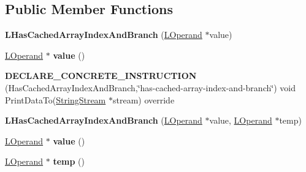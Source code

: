 \subsection*{Public Member Functions}
\begin{DoxyCompactItemize}
\item 
{\bfseries L\+Has\+Cached\+Array\+Index\+And\+Branch} (\hyperlink{classv8_1_1internal_1_1_l_operand}{L\+Operand} $\ast$value)\hypertarget{classv8_1_1internal_1_1_l_has_cached_array_index_and_branch_a466ac157abb71acfb478af7ce2d78d3e}{}\label{classv8_1_1internal_1_1_l_has_cached_array_index_and_branch_a466ac157abb71acfb478af7ce2d78d3e}

\item 
\hyperlink{classv8_1_1internal_1_1_l_operand}{L\+Operand} $\ast$ {\bfseries value} ()\hypertarget{classv8_1_1internal_1_1_l_has_cached_array_index_and_branch_ac41a448a9c06b6b037880bdea9490ae4}{}\label{classv8_1_1internal_1_1_l_has_cached_array_index_and_branch_ac41a448a9c06b6b037880bdea9490ae4}

\item 
{\bfseries D\+E\+C\+L\+A\+R\+E\+\_\+\+C\+O\+N\+C\+R\+E\+T\+E\+\_\+\+I\+N\+S\+T\+R\+U\+C\+T\+I\+ON} (Has\+Cached\+Array\+Index\+And\+Branch,\char`\"{}has-\/cached-\/array-\/index-\/and-\/branch\char`\"{}) void Print\+Data\+To(\hyperlink{classv8_1_1internal_1_1_string_stream}{String\+Stream} $\ast$stream) override\hypertarget{classv8_1_1internal_1_1_l_has_cached_array_index_and_branch_ada0480ef52e3ce280f071aa7c11faa18}{}\label{classv8_1_1internal_1_1_l_has_cached_array_index_and_branch_ada0480ef52e3ce280f071aa7c11faa18}

\item 
{\bfseries L\+Has\+Cached\+Array\+Index\+And\+Branch} (\hyperlink{classv8_1_1internal_1_1_l_operand}{L\+Operand} $\ast$value, \hyperlink{classv8_1_1internal_1_1_l_operand}{L\+Operand} $\ast$temp)\hypertarget{classv8_1_1internal_1_1_l_has_cached_array_index_and_branch_ab312de41323135127a20207e0065a401}{}\label{classv8_1_1internal_1_1_l_has_cached_array_index_and_branch_ab312de41323135127a20207e0065a401}

\item 
\hyperlink{classv8_1_1internal_1_1_l_operand}{L\+Operand} $\ast$ {\bfseries value} ()\hypertarget{classv8_1_1internal_1_1_l_has_cached_array_index_and_branch_ac41a448a9c06b6b037880bdea9490ae4}{}\label{classv8_1_1internal_1_1_l_has_cached_array_index_and_branch_ac41a448a9c06b6b037880bdea9490ae4}

\item 
\hyperlink{classv8_1_1internal_1_1_l_operand}{L\+Operand} $\ast$ {\bfseries temp} ()\hypertarget{classv8_1_1internal_1_1_l_has_cached_array_index_and_branch_a7622b02ba85466739c57775bf39a8399}{}\label{classv8_1_1internal_1_1_l_has_cached_array_index_and_branch_a7622b02ba85466739c57775bf39a8399}


\end{DoxyCompactItemize}
